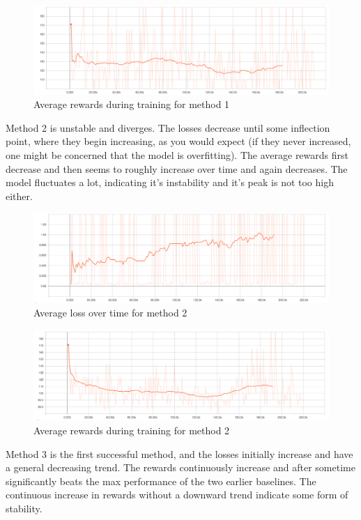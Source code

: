 \documentclass{article}
\begin{document}
\begin{figure}[H]
\centering
\includegraphics[scale=0.17]{naive_reward.png}
\caption{Average rewards during training for method 1}
\end{figure}

Method 2 is unstable and diverges. The losses decrease until some inflection
point, where they begin increasing, as you would expect (if they never
increased, one might be concerned that the model is overfitting). The average
rewards first decrease and then seems to roughly increase over time and again decreases.
The model fluctuates a lot, indicating it's instability and it's peak is not too high either.

\begin{figure}[H]
\centering
\includegraphics[scale=0.17]{parallel_loss.png}
\caption{Average loss over time for method 2}
\end{figure}

\begin{figure}[H]
\centering
\includegraphics[scale=0.17]{parallel_reward.png}
\caption{Average rewards during training for method 2}
\end{figure}


Method 3 is the first successful method, and the losses initially increase
and have a general decreasing trend. The rewards continuously increase and
after sometime significantly beats the max performance of the two
earlier baselines. The continuous increase in rewards without a downward
trend indicate some form of stability.
\end{document}
